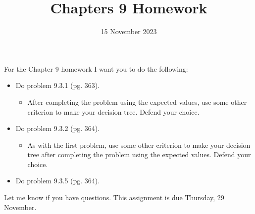 \documentclass{article}
\title{Chapters 9 Homework}
\date{15 November 2023}
\begin{document}
\maketitle

For the Chapter 9 homework I want you to do the following:

\begin{itemize}
\item Do problem 9.3.1 (pg. 363). 
\begin{itemize}
\item After completing the problem using the expected values, use some other criterion to make your decision tree. Defend your choice.
\end{itemize}
\item Do problem 9.3.2 (pg. 364). 

\begin{itemize}
\item As with the first problem, use some other criterion to make your decision tree after completing the problem using the expected values. Defend your choice.
\end{itemize}

\item Do problem 9.3.5 (pg. 364). 

\end{itemize}

Let me know if you have questions. This assignment is due Thursday, 29 November.
\end{document}
